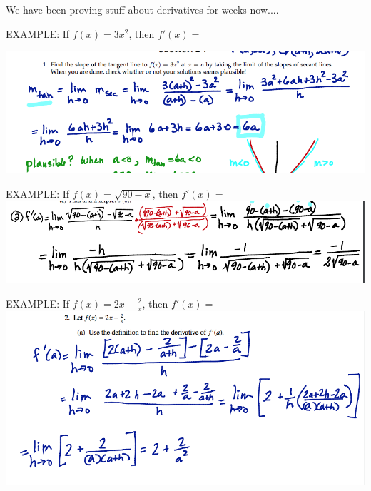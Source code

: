 \documentclass[11pt,fleqn]{article}
\begin{document}
\setlength{\parindent}{0cm}
\renewcommand{\headrulewidth}{0pt}
\newcommand{\blank}[1]{\rule{#1}{0.75pt}}
\renewcommand{\d}{\displaystyle}
\vspace*{-0.9in}
\begin{center}
  \large {}
\end{center}
\small

{\Large{We have been proving stuff about derivatives for weeks now....}}\\
\vfill

{\LARGE{EXAMPLE: If $f(x)=3x^2$, then $f'(x) =$ }}\\
\vfill

\includegraphics[scale=.5]{der2.png}\\

\vfill

{\LARGE{EXAMPLE: If $f(x)=\sqrt{90-x}$, then $f'(x) =$ }}\\

\vfill
\includegraphics[scale=.5]{der1.png}

\vfill

{\LARGE{EXAMPLE: If $f(x)=2x-\frac{2}{x}$, then $f'(x) =$ }}\\
\vfill
\includegraphics[scale=.5]{der3.png}
\newpage
\end{document}

